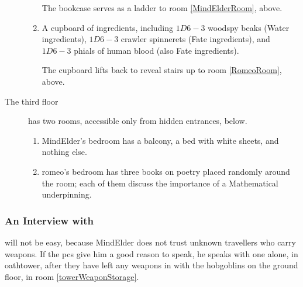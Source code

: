 \begin{multicols}{2}
\begin{description}
\begin{enumerate}
    The bookcase serves as a ladder to room \ref{MindElderRoom}, above.
    \item
    A cupboard of \glspl{ingredient}, including $1D6-3$ \gls{woodspy} beaks (Water \glspl{ingredient}), $1D6-3$ \gls{crawler} spinnerets (Fate \glspl{ingredient}), and $1D6-3$ phials of human blood (also Fate \glspl{ingredient}).

    The cupboard lifts back to reveal stairs up to room \ref{RomeoRoom}, above.
  \end{enumerate}
  \item[The third floor]
  has two rooms, accessible only from hidden entrances, below.
  \begin{enumerate}
    \item
    \Gls{MindElder}'s bedroom has a balcony, a bed with white sheets, and nothing else.\label{MindElderRoom}
    \item
    \Gls{romeo}'s bedroom has three books on poetry placed randomly around the room; each of them discuss the importance of a Mathematical underpinning.\label{RomeoRoom}
  \end{enumerate}
\end{description}



\label{Majiscule}

\subsubsection{An Interview with }
will not be easy, because \Gls{MindElder} does not trust unknown travellers who carry weapons.
If the \glspl{pc} give him a good reason to speak, he speaks with one alone, in \gls{oathtower}, after they have left any weapons in with the hobgoblins on the ground floor, in room \vref{towerWeaponStorage}.


\end{multicols}
